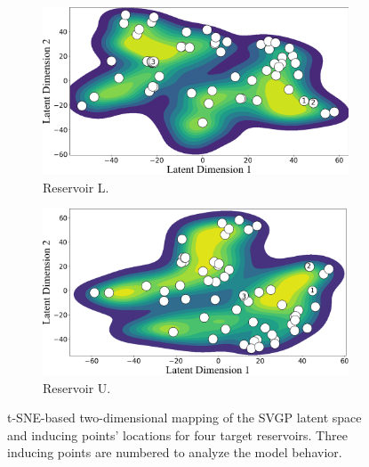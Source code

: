 \begin{frame}
\begin{figure}[htbp]
		\begin{subfigure}[t]{0.38\columnwidth}
			\centering
			\includegraphics[width=\columnwidth]{chp_sogp/figures/TSNE_task11_kde_p30.png}
			\caption{Reservoir L.}
			\label{fig:points_locations_L}
		\end{subfigure}
		\hspace{0.05\columnwidth} %
		\begin{subfigure}[t]{0.38\columnwidth}
			\centering
			\includegraphics[width=\columnwidth]{chp_sogp/figures/TSNE_task20_kde_p30.png}
			\caption{Reservoir U.}
			\label{fig:points_locations_U}
		\end{subfigure}
		
		\vspace{0.1cm} %
		
		\caption{t-SNE-based two-dimensional mapping of the SVGP latent space and inducing points' locations for four target reservoirs. Three inducing points are numbered to analyze the model behavior.}
		\label{fig:inducing_points_locations}
	\end{figure}
\end{frame}


